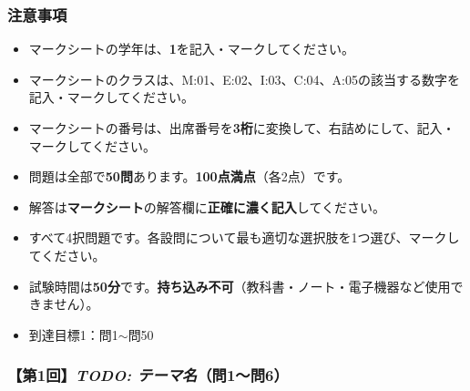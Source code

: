 \documentclass[b4paper,7pt,twocolumn,landscape]{jsarticle}
\begin{document}

\subsubsection*{注意事項}
{
\begin{itemize}
  \item マークシートの学年は、\textbf{1}を記入・マークしてください。
  \item マークシートのクラスは、M:01、E:02、I:03、C:04、A:05の該当する数字を記入・マークしてください。
  \item マークシートの番号は、出席番号を\textbf{3桁}に変換して、右詰めにして、記入・マークしてください。
  \item 問題は全部で\textbf{50問}あります。\textbf{100点満点}（各2点）です。
  \item 解答は\textbf{マークシート}の解答欄に\textbf{正確に濃く記入}してください。
  \item すべて4択問題です。各設問について最も適切な選択肢を1つ選び、マークしてください。
  \item 試験時間は\textbf{50分}です。\textbf{持ち込み不可}（教科書・ノート・電子機器など使用できません）。
  \item 到達目標1：問1$\sim$問50
\end{itemize}
}

\subsubsection*{【第1回】\textit{TODO: テーマ名}（問1〜問6）}
\end{document}
